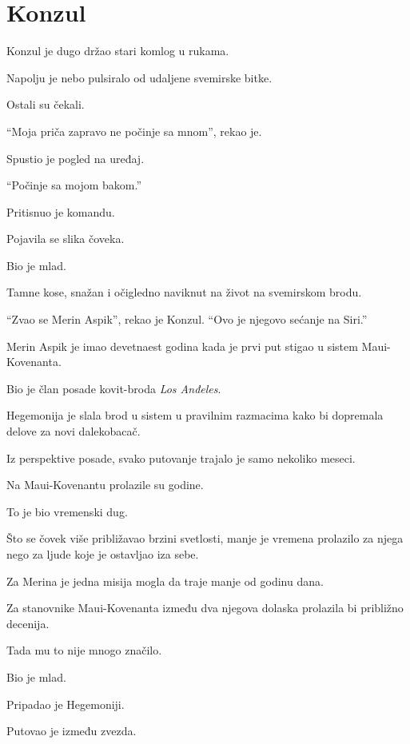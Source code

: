 \chapter{Konzul}


Konzul je dugo držao stari komlog u rukama.

Napolju je nebo pulsiralo od udaljene svemirske bitke.

Ostali su čekali.

``Moja priča zapravo ne počinje sa mnom'', rekao je.

Spustio je pogled na uređaj.

``Počinje sa mojom bakom.''

Pritisnuo je komandu.

Pojavila se slika čoveka.

Bio je mlad.

Tamne kose, snažan i očigledno naviknut na život na svemirskom brodu.

``Zvao se Merin Aspik'', rekao je Konzul. ``Ovo je njegovo sećanje na Siri.''

\bigskip

Merin Aspik je imao devetnaest godina kada je prvi put stigao u sistem Maui-Kovenanta.

Bio je član posade kovit-broda \emph{Los Anđeles}.

Hegemonija je slala brod u sistem u pravilnim razmacima kako bi dopremala delove za novi dalekobacač.

Iz perspektive posade, svako putovanje trajalo je samo nekoliko meseci.

Na Maui-Kovenantu prolazile su godine.

To je bio vremenski dug.

Što se čovek više približavao brzini svetlosti, manje je vremena prolazilo za njega nego za ljude koje je ostavljao iza sebe.

Za Merina je jedna misija mogla da traje manje od godinu dana.

Za stanovnike Maui-Kovenanta između dva njegova dolaska prolazila bi približno decenija.

Tada mu to nije mnogo značilo.

Bio je mlad.

Pripadao je Hegemoniji.

Putovao je između zvezda.

